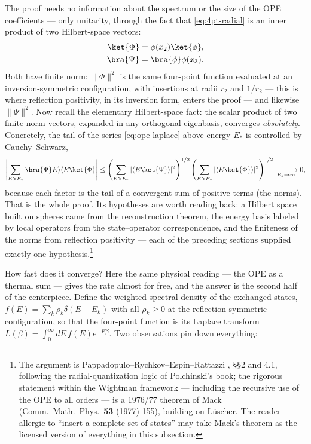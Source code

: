 The proof needs no information about the spectrum or the size of the OPE
coefficients --- only unitarity, through the fact that \eqref{eq:4pt-radial}
is an inner product of two Hilbert-space vectors:
\begin{equation}
\begin{aligned}
\ket{\Phi} &= \phi(x_2)\ket{\phi},\\
\bra{\Psi} &= \bra{\phi}\phi(x_3) .
\end{aligned}
\end{equation}
Both have finite norm: $\|\Phi\|^2$ is the same four-point function evaluated
at an inversion-symmetric configuration, with insertions at radii $r_2$ and
$1/r_2$ --- this is where reflection positivity, in its inversion form,
enters the proof --- and likewise $\|\Psi\|^2$. Now recall the elementary
Hilbert-space fact: the
scalar product of two finite-norm vectors, expanded in any orthogonal
eigenbasis, converges \emph{absolutely}. Concretely, the tail of the series
\eqref{eq:ope-laplace} above energy $E_*$ is controlled by Cauchy--Schwarz,
\begin{equation}
\left| \sum_{E > E_*} \bra{\Psi}E\rangle\langle E\ket{\Phi} \right|
\le
\left(\sum_{E > E_*} |\langle E\ket{\Psi}\rangle|^2\right)^{1/2}
\left(\sum_{E > E_*} |\langle E\ket{\Phi}\rangle|^2\right)^{1/2}
\xrightarrow[E_* \to \infty]{} 0,
\label{eq:cauchy-schwarz-tail}
\end{equation}
because each factor is the tail of a convergent sum of positive terms (the
norms). That is the whole proof. Its hypotheses are worth reading back: a
Hilbert space built on spheres came from the reconstruction theorem, the
energy basis labeled by local operators from the state--operator
correspondence, and the finiteness of the norms from reflection positivity
--- each of the preceding sections supplied exactly one
hypothesis.\footnote{The argument
is Pappadopulo--Rychkov--Espin--Rattazzi , \S\S2 and 4.1,
following the radial-quantization logic of Polchinski's book; the rigorous
statement within the Wightman framework --- including the recursive use of
the OPE to all orders --- is a 1976/77 theorem of Mack (Comm.\ Math.\ Phys.\
\textbf{53} (1977) 155), building on L\"uscher. The reader allergic to
``insert a complete set of states'' may take Mack's theorem as the licensed
version of everything in this subsection.}

How fast does it converge? Here the same physical reading --- the OPE as a
thermal sum --- gives the rate almost for free, and the answer is the second
half of the centerpiece. Define the weighted spectral density of the exchanged
states, $f(E) = \sum_k \rho_k \delta(E - E_k)$ with all $\rho_k \ge 0$ at the
reflection-symmetric configuration, so that the four-point function is its
Laplace transform $L(\beta) = \int_0^\infty dE\, f(E) e^{-E\beta}$. Two
observations pin down everything:

